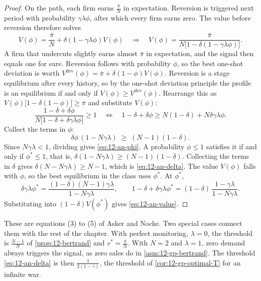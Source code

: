 \begin{proof}
On the path, each firm earns $\frac{\bar\pi}{N}$ in expectation. Reversion is triggered next period with probability
$\gamma\lambda\phi$, after which every firm earns zero. The value before reversion therefore solves
\begin{equation*}
V(\phi) = \frac{\bar\pi}{N} + \delta(1 - \gamma\lambda\phi)V(\phi)
\quad\Longrightarrow\quad
V(\phi) = \frac{\bar\pi}{N\bigl[1 - \delta(1 - \gamma\lambda\phi)\bigr]} .
\end{equation*}
A firm that undercuts slightly earns almost $\bar\pi$ in expectation, and the signal then equals one for sure.
Reversion follows with probability $\phi$, so the best one-shot deviation is worth
$V^{\mathrm{dev}}(\phi) = \bar\pi + \delta(1 - \phi)V(\phi)$. Reversion is a stage equilibrium after every history,
so by the one-shot deviation principle the profile is an equilibrium if and only if $V(\phi) \ge V^{\mathrm{dev}}(\phi)$.
Rearrange this as $V(\phi)\bigl[1 - \delta(1 - \phi)\bigr] \ge \bar\pi$ and substitute $V(\phi)$:
\begin{equation*}
\frac{1 - \delta + \delta\phi}{N\bigl[1 - \delta + \delta\gamma\lambda\phi\bigr]} \ge 1
\quad\Longleftrightarrow\quad
1 - \delta + \delta\phi \ge N(1 - \delta) + N\delta\gamma\lambda\phi .
\end{equation*}
Collect the terms in $\phi$:
\begin{equation*}
\delta\phi\,(1 - N\gamma\lambda) \;\ge\; (N - 1)(1 - \delta) .
\end{equation*}
Since $N\gamma\lambda < 1$, dividing gives \eqref{eq:12-an-phi}. A probability $\phi \le 1$ satisfies it if and only
if $\phi^* \le 1$, that is, $\delta(1 - N\gamma\lambda) \ge (N - 1)(1 - \delta)$. Collecting the terms in $\delta$ gives
$\delta(N - N\gamma\lambda) \ge N - 1$, which is \eqref{eq:12-an-delta}. The value $V(\phi)$ falls with $\phi$, so the
best equilibrium in the class uses $\phi^*$. At $\phi^*$,
\begin{equation*}
\delta\gamma\lambda\phi^* = \frac{(1 - \delta)(N - 1)\gamma\lambda}{1 - N\gamma\lambda},
\qquad
1 - \delta + \delta\gamma\lambda\phi^* = (1 - \delta)\,\frac{1 - \gamma\lambda}{1 - N\gamma\lambda} .
\end{equation*}
Substituting into $(1 - \delta)V(\phi^*)$ gives \eqref{eq:12-an-value}.
\end{proof}

These are equations (3) to (5) of Asker and Nocke. Two special cases connect them with the rest of the chapter. With
perfect monitoring, $\lambda = 0$, the threshold is $\frac{N - 1}{N}$ of \cref{prop:12-bertrand} and $v^* =
\frac{\bar\pi}{N}$. With $N = 2$ and $\lambda = 1$, zero demand always triggers the signal, as zero sales do in
\cref{asm:12-gp-bertrand}. The threshold \eqref{eq:12-an-delta} is then $\frac{1}{2(1 - \gamma)}$, the threshold of
\cref{cor:12-gp-optimal-T} for an infinite war.

